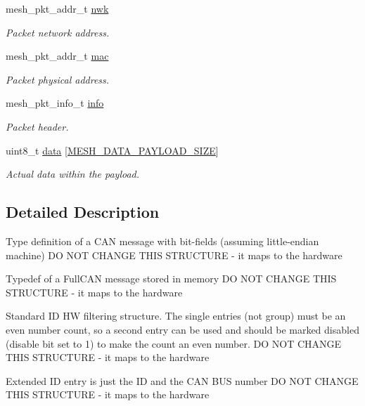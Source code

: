 \begin{DoxyCompactItemize}
mesh\+\_\+pkt\+\_\+addr\+\_\+t \hyperlink{struct____attribute_____acca30e839928f53cd58dad5de67e9179}{nwk}
\begin{DoxyCompactList}\small\item\em Packet network address. \end{DoxyCompactList}\item 
mesh\+\_\+pkt\+\_\+addr\+\_\+t \hyperlink{struct____attribute_____ab98af19336ed7ec3ca480cb93d16e106}{mac}
\begin{DoxyCompactList}\small\item\em Packet physical address. \end{DoxyCompactList}\item 
mesh\+\_\+pkt\+\_\+info\+\_\+t \hyperlink{struct____attribute_____a12c2cc9433afd67e97b7de65d9d58735}{info}
\begin{DoxyCompactList}\small\item\em Packet header. \end{DoxyCompactList}\item 
uint8\+\_\+t \hyperlink{struct____attribute_____a0bb6bcfb06a69a501d1dfd0a0f1b1222}{data} \mbox{[}\hyperlink{mesh__typedefs_8h_a3a202f51bca7a0dbd86db707179fe827}{M\+E\+S\+H\+\_\+\+D\+A\+T\+A\+\_\+\+P\+A\+Y\+L\+O\+A\+D\+\_\+\+S\+I\+ZE}\mbox{]}
\begin{DoxyCompactList}\small\item\em Actual data within the payload. \end{DoxyCompactList}\end{DoxyCompactItemize}


\subsection{Detailed Description}
Type definition of a C\+AN message with bit-\/fields (assuming little-\/endian machine) DO N\+OT C\+H\+A\+N\+GE T\+H\+IS S\+T\+R\+U\+C\+T\+U\+RE -\/ it maps to the hardware

Typedef of a Full\+C\+AN message stored in memory DO N\+OT C\+H\+A\+N\+GE T\+H\+IS S\+T\+R\+U\+C\+T\+U\+RE -\/ it maps to the hardware

Standard ID HW filtering structure. The single entries (not group) must be an even number count, so a second entry can be used and should be marked disabled (disable bit set to 1) to make the count an even number. DO N\+OT C\+H\+A\+N\+GE T\+H\+IS S\+T\+R\+U\+C\+T\+U\+RE -\/ it maps to the hardware

Extended ID entry is just the ID and the C\+AN B\+US number DO N\+OT C\+H\+A\+N\+GE T\+H\+IS S\+T\+R\+U\+C\+T\+U\+RE -\/ it maps to the hardware

